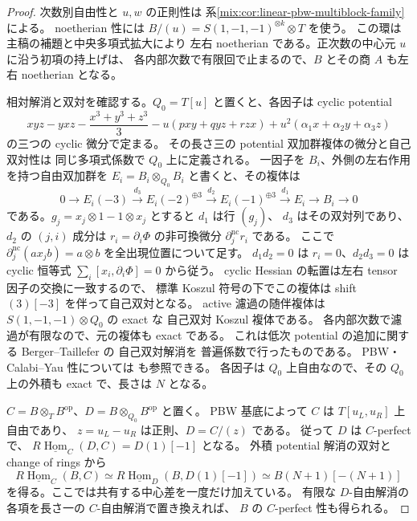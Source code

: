 \begin{proof}
次数別自由性と $u,w$ の正則性は
系\ref{mix:cor:linear-pbw-multiblock-family}による。
noetherian 性には $B/(u)=S(1,-1,-1)^{\otimes k}\otimes T$ を使う。
この環は主稿の補題と中央多項式拡大により
左右 noetherian である。正次数の中心元 $u$ に沿う初項の持上げは、
各内部次数で有限回で止まるので、$B$ とその商 $A$ も左右 noetherian となる。

相対解消と双対を確認する。$Q_0=T[u]$ と置くと、各因子は cyclic potential
\[
 xyz-yxz-\frac{x^3+y^3+z^3}{3}
 -u(pxy+qyz+rzx)+u^2(\alpha_1x+\alpha_2y+\alpha_3z)
\]
の三つの cyclic 微分で定まる。
その長さ三の potential 双加群複体の微分と自己双対性は
同じ多項式係数で $Q_0$ 上に定義される。
一因子を $B_i$、外側の左右作用を持つ自由双加群を
$E_i=B_i\otimes_{Q_0}B_i$ と書くと、その複体は
\[
 0\longrightarrow E_i(-3)
 \xrightarrow{d_3}E_i(-2)^{\oplus3}
 \xrightarrow{d_2}E_i(-1)^{\oplus3}
 \xrightarrow{d_1}E_i
 \longrightarrow B_i\longrightarrow0
\]
である。$g_j=x_j\otimes1-1\otimes x_j$ とすると $d_1$ は行 $(g_j)$、
$d_3$ はその双対列であり、$d_2$ の $(j,i)$ 成分は
$r_i=\partial_i\Phi$ の非可換微分
$\partial_j^{\mathrm{nc}}r_i$ である。
ここで $\partial_j^{\mathrm{nc}}(a x_j b)=a\otimes b$ を全出現位置について足す。
$d_1d_2=0$ は $r_i=0$、$d_2d_3=0$ は cyclic 恒等式
$\sum_i[x_i,\partial_i\Phi]=0$ から従う。
cyclic Hessian の転置は左右 tensor 因子の交換に一致するので、
標準 Koszul 符号の下でこの複体は shift $(3)[-3]$ を伴って自己双対となる。
active 濾過の随伴複体は $S(1,-1,-1)\otimes Q_0$ の exact な
自己双対 Koszul 複体である。
各内部次数で濾過が有限なので、元の複体も exact である。
これは低次 potential の追加に関する Berger--Taillefer の
自己双対解消\cite[Theorem~3.6, Lemma~3.7 and proof, pp.~252--256]{NFMBeTa}を
普遍係数で行ったものである。
PBW・Calabi--Yau 性については
\cite[Proposition~7.3.1(ii), Theorem~3.3.2(i)]{NFMEG}も参照できる。
各因子は $Q_0$ 上自由なので、その $Q_0$ 上の外積も exact で、長さは $N$ となる。

$C=B\otimes_TB^{\mathrm{op}}$、$D=B\otimes_{Q_0}B^{\mathrm{op}}$ と置く。
PBW 基底によって $C$ は $T[u_L,u_R]$ 上自由であり、
$z=u_L-u_R$ は正則、$D=C/(z)$ である。
従って $D$ は $C$-perfect で、
$R\underline{\operatorname{Hom}}_C(D,C)=D(1)[-1]$ となる。
外積 potential 解消の双対と change of rings から
\[
 R\underline{\operatorname{Hom}}_C(B,C)
 \simeq R\underline{\operatorname{Hom}}_D(B,D(1)[-1])
 \simeq B(N+1)[-(N+1)]
\]
を得る。ここでは共有する中心差を一度だけ加えている。
有限な $D$-自由解消の各項を長さ一の $C$-自由解消で置き換えれば、
$B$ の $C$-perfect 性も得られる。


\end{proof}
